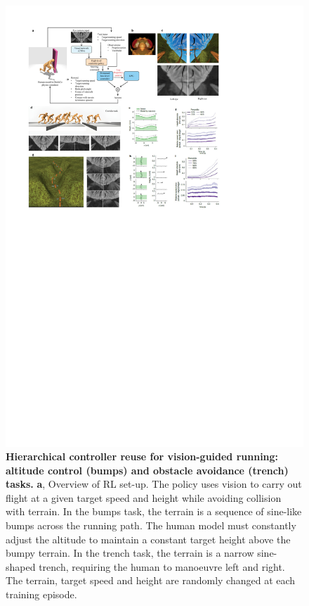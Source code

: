 \documentclass[sn-mathphys-num]{sn-jnl}%
\theoremstyle{thmstyleone}	%
\theoremstyle{thmstyletwo}	%
\theoremstyle{thmstylethree}	%
\begin{document}
\begin{figure}[!htb]
	\centering
	\includegraphics[width=1.0\textwidth]{fig/fig_4.pdf}
	\caption{
		\textbf{Hierarchical controller reuse for vision-guided running: altitude control (bumps) and obstacle avoidance (trench) tasks.} 
		\textbf{a}, Overview of RL set-up. 
		The policy uses vision to carry out flight at a given target speed and height while avoiding collision with terrain. 
		In the bumps task, the terrain is a sequence of sine-like bumps across the running path. 
		The human model must constantly adjust the altitude to maintain a constant target height above the bumpy terrain. 
		In the trench task, the terrain is a narrow sine-shaped trench, requiring the human to manoeuvre left and right. 
		The terrain, target speed and height are randomly changed at each training episode. 
}
\end{figure}
\end{document}
